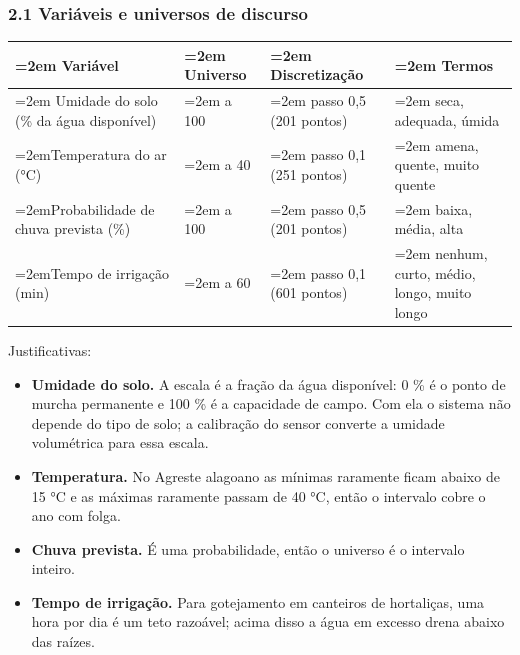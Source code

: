 \documentclass[12pt, a4paper]{article}
\providecommand{\tightlist}{%
  \setlength{\itemsep}{0pt}\setlength{\parskip}{0pt}}
\begin{document}
\subsubsection{2.1 Variáveis e universos de discurso}\label{21-variuxe1veis-e-universos-de-discurso}

\begingroup
\setlength{\tabcolsep}{4.0pt}
\begin{longtable}{@{}>{\raggedright\hyphenpenalty=30\tolerance=999\emergencystretch=2em\arraybackslash}p{4.93cm}>{\raggedright\hyphenpenalty=30\tolerance=999\emergencystretch=2em\arraybackslash}p{1.75cm}>{\raggedright\hyphenpenalty=30\tolerance=999\emergencystretch=2em\arraybackslash}p{2.91cm}>{\raggedright\hyphenpenalty=30\tolerance=999\emergencystretch=2em\arraybackslash}p{4.85cm}@{}}
\toprule\noalign{}
Variável & Universo & Dis\-cre\-ti\-za\-ção & Termos \\
\midrule\noalign{}
\endhead
\bottomrule\noalign{}
\endlastfoot
Umidade do solo (\% da água dis\-po\-ní\-vel\allowbreak ) & 0 a 100 & passo 0,5 (201 pontos\allowbreak ) & seca, adequada, úmida \\
Temperatura do ar (°C\allowbreak ) & 15 a 40 & passo 0,1 (251 pontos\allowbreak ) & amena, quente, muito quente \\
Probabilidade de chuva prevista (\%) & 0 a 100 & passo 0,5 (201 pontos\allowbreak ) & baixa, média, alta \\
Tempo de irrigação (min\allowbreak ) & 0 a 60 & passo 0,1 (601 pontos\allowbreak ) & nenhum, curto, médio, longo, muito longo \\
\end{longtable}
\endgroup

Justificativas:

\begin{itemize}
\tightlist
\item
  \textbf{Umidade do solo.} A escala é a fração da água disponível: 0 \% é o ponto de murcha permanente e 100 \% é a capacidade de campo. Com ela o sistema não depende do tipo de solo; a calibração do sensor converte a umidade volumétrica para essa escala.
\item
  \textbf{Temperatura.} No Agreste alagoano as mínimas raramente ficam abaixo de 15 °C e as máximas raramente passam de 40 °C, então o intervalo cobre o ano com folga.
\item
  \textbf{Chuva prevista.} É uma probabilidade, então o universo é o intervalo inteiro.
\item
  \textbf{Tempo de irrigação.} Para gotejamento em canteiros de hortaliças, uma hora por dia é um teto razoável; acima disso a água em excesso drena abaixo das raízes.
\end{itemize}
\end{document}
